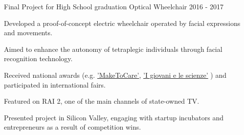 

\begin{cventries}

  \cventry
    {Final Project for High School graduation} %
    {Optical Wheelchair} %
    {} %
    {2016 - 2017} %
    {
      \begin{cvitems} %
        \item {Developed a proof-of-concept electric wheelchair operated by facial expressions and movements.}
        \item {Aimed to enhance the autonomy of tetraplegic individuals through facial recognition technology.}
        \item {Received national awards (e.g. 
            \href{https://www.maketocare.it/?sc_lang=en}{'MakeToCare'},
            \href{https://fast.mi.it/i-giovani-e-le-scienze/}{'I giovani e le scienze'}
            ) and participated in international fairs.}
        \item {Featured on RAI 2, one of the main channels of state-owned TV.}
        \item {Presented project in Silicon Valley, engaging with startup incubators and entrepreneurs as a result of competition wins.}
      \end{cvitems}
    }

\end{cventries}
